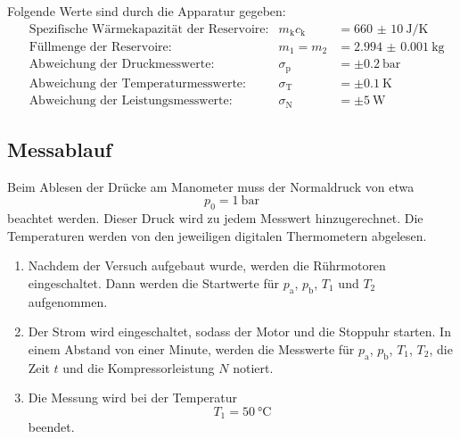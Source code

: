 Folgende Werte sind durch die Apparatur gegeben:
\begin{align}
  & \text{Spezifische Wärmekapazität der Reservoire:} & m_\text{k}c_\text{k} & =\SI{660(10)}
  {\joule\per\kelvin} \\
  & \text{Füllmenge der Reservoire:} & m_1 = m_2 & = \SI{2.994(1)}{\kilo\gram} \\
  & \text{Abweichung der Druckmesswerte:} & \sigma_\text{p} & =\pm \SI{0.2}
  {\bar} \\
  & \text{Abweichung der Temperaturmesswerte:} & \sigma_\text{T} & =\pm
  \SI{0.1}{\kelvin} \\
  & \text{Abweichung der Leistungsmesswerte:} & \sigma_\text{N} & =\pm \SI{5}
  {\watt}
\end{align}

\subsection{Messablauf}

Beim Ablesen der Drücke am Manometer muss der Normaldruck von etwa
\begin{equation}
  p_0 = \SI{1}{\bar}
\end{equation}
beachtet werden. Dieser Druck wird zu jedem Messwert hinzugerechnet.
Die Temperaturen werden von den jeweiligen digitalen Thermometern abgelesen.

\begin{enumerate}

\item Nachdem der Versuch aufgebaut wurde, werden die Rührmotoren eingeschaltet.
Dann werden die Startwerte für $p_\text{a}$, $p_\text{b}$, $T_1$ und $T_2$
aufgenommen.

\item Der Strom wird eingeschaltet, sodass der Motor und die Stoppuhr starten.
In einem Abstand von einer Minute, werden die Messwerte für $p_\text{a}$,
$p_\text{b}$, $T_1$, $T_2$, die Zeit $t$ und die Kompressorleistung $N$ notiert.

\item Die Messung wird bei der Temperatur
\begin{equation}
  T_1 = \SI{50}{\celsius}
\end{equation}
beendet.

\end{enumerate}
